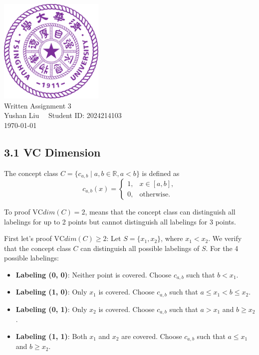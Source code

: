 \documentclass[12pt]{article}
\begin{document}
\begin{titlepage}
    \begin{center}
        \includegraphics[width=5cm]{tsinghua_logo.png}\\[4cm]  %
        {\Huge Written Assignment 3} \\[2cm]
        {\large Yushan Liu  \ \  Student ID: 2024214103}\\[6cm]
        {\normalsize \today}\\[1cm]

        \vfill
        
    \end{center}
\end{titlepage}


\subsection*{3.1 VC Dimension}

The concept class \( C = \{ c_{a,b} \mid a, b \in \mathbb{R}, a < b \} \) is defined as  
\[
c_{a,b}(x) = 
\begin{cases} 
1, & x \in [a, b], \\ 
0, & \text{otherwise}.
\end{cases}
\]  

To proof $\text{VC}dim(C)=2$, means that the concept class can distinguish all labelings 
for up to 2 points but cannot distinguish all labelings for 3 points.

First let's proof $\text{VC}dim(C)\ge 2$:
Let \( S = \{x_1, x_2\} \), where \( x_1 < x_2 \). We verify that the concept class \( C \) can distinguish all possible labelings of \( S \). For the 4 possible labelings:

\begin{itemize}
    \item \textbf{Labeling (0, 0)}: Neither point is covered. Choose \( c_{a,b} \) such that \( b < x_1 \).
    \item \textbf{Labeling (1, 0)}: Only \( x_1 \) is covered. Choose \( c_{a,b} \) such that \( a \leq x_1 < b \leq x_2 \).
    \item \textbf{Labeling (0, 1)}: Only \( x_2 \) is covered. Choose \( c_{a,b} \) such that \( a > x_1 \) and \( b \geq x_2 \).
    \item \textbf{Labeling (1, 1)}: Both \( x_1 \) and \( x_2 \) are covered. Choose \( c_{a,b} \) such that \( a \leq x_1 \) and \( b \geq x_2 \).
\end{itemize}
\end{document}
